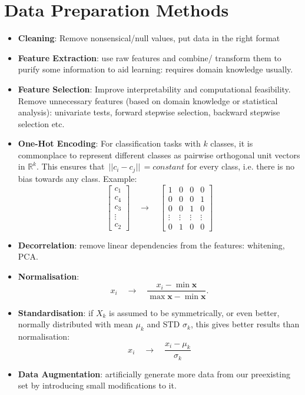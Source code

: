 \documentclass{article}
\renewcommand{\vec}[1]{\mathbf{#1}}
\renewcommand{\|}{\,\,|\,\,}
\newcommand{\norm}[1]{\,||#1||\,}
\newcommand{\Reals}{\mathbb{R}}
\begin{document}
\section{Data Preparation Methods}
\begin{itemize}
\item \textbf{Cleaning}: Remove nonsensical/null values, put data in the right
  format
\item \textbf{Feature Extraction}: use raw features and combine/ transform them
  to purify some information to aid learning: requires domain knowledge usually.
\item \textbf{Feature Selection}: Improve interpretability and computational
  feasibility. Remove unnecessary features (based on domain knowledge or
  statistical analysis): univariate tests, forward stepwise selection, backward
  stepwise selection etc.
\item \textbf{One-Hot Encoding}: For classification tasks with $k$ classes, it is commonplace to
  represent different classes as pairwise orthogonal unit vectors in $\Reals^k$.
  This ensures that $\norm{c_i - c_j} = constant$ for every class, i.e. there is
  no bias towards any class. Example:
  \[
    \begin{bmatrix}
      c_1 \\
      c_4 \\
      c_3 \\
      \vdots \\
      c_2
    \end{bmatrix}
    \quad \to \quad
    \begin{bmatrix}
      1 & 0 & 0 & 0 \\
      0 & 0 & 0 & 1 \\
      0 & 0 & 1 & 0 \\
      \vdots & \vdots & \vdots & \vdots \\
      0 & 1 & 0 & 0
    \end{bmatrix}
  \]
\item \textbf{Decorrelation}: remove linear dependencies from the features:
  whitening, PCA.
\item \textbf{Normalisation}:
  \[
    x_i \quad \to \quad \frac{x_i - \min{\vec{x}}}{\max{\vec{x}} - \min{\vec{x}}}.
  \]
\item \textbf{Standardisation}:
  if $X_k$ is assumed to be symmetrically, or even better, normally distributed
  with mean $\mu_k$ and STD $\sigma_k$, this gives better results than normalisation:
  \[
    x_i \quad \to \quad \frac{x_i - \mu_k}{\sigma_k} 
  \]
\item \textbf{Data Augmentation}: artificially generate more data from our
  preexisting set by introducing small modifications to it.
\end{itemize}
\end{document}
